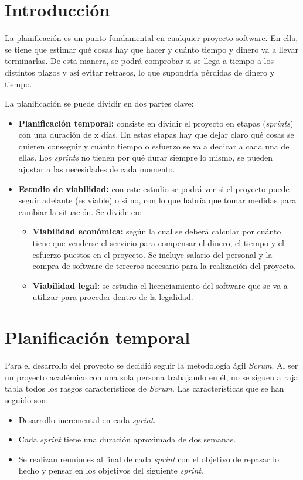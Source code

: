 
\section{Introducción}
La planificación es un punto fundamental en cualquier proyecto software. En ella, se tiene que estimar qué cosas hay que hacer y cuánto tiempo y dinero va a llevar terminarlas. De esta manera, se podrá comprobar si se llega a tiempo a los distintos plazos y así evitar retrasos, lo que supondría pérdidas de dinero y tiempo.

La planificación se puede dividir en dos partes clave:
\begin{itemize}
\tightlist
\item \textbf{Planificación temporal:} consiste en dividir el proyecto en etapas (\textit{sprints}) con una duración de x días. En estas etapas hay que dejar claro qué cosas se quieren conseguir y cuánto tiempo o esfuerzo se va a dedicar a cada una de ellas. Los \textit{sprints} no tienen por qué durar siempre lo mismo, se pueden ajustar a las necesidades de cada momento.
\item \textbf{Estudio de viabilidad:} con este estudio se podrá ver si el proyecto puede seguir adelante (es viable) o si no, con lo que habría que tomar medidas para cambiar la situación. Se divide en:
\begin{itemize}
\tightlist
\item \textbf{Viabilidad económica:} según la cual se deberá calcular por cuánto tiene que venderse el servicio para compensar el dinero, el tiempo y el esfuerzo puestos en el proyecto. Se incluye salario del personal y la compra de software de terceros necesario para la realización del proyecto.
\item \textbf{Viabilidad legal:} se estudia el licenciamiento del software que se va a utilizar para proceder dentro de la legalidad.
\end{itemize}
\end{itemize}

\section{Planificación temporal}
Para el desarrollo del proyecto se decidió seguir la metodología ágil \textit{Scrum}. Al ser un proyecto académico con una sola persona trabajando en él, no se siguen a raja tabla todos los rasgos característicos de \textit{Scrum}. Las características que se han seguido son:
\begin{itemize}
\tightlist
\item Desarrollo incremental en cada \textit{sprint}.
\item Cada \textit{sprint} tiene una duración aproximada de dos semanas.
\item Se realizan reuniones al final de cada \textit{sprint} con el objetivo de repasar lo hecho y pensar en los objetivos del siguiente \textit{sprint}.
\end{itemize}

